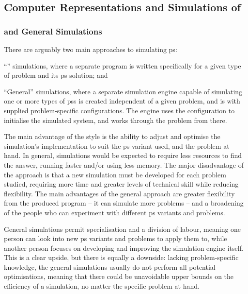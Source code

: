 
\subsection{Computer Representations and Simulations of }

\subsubsection{\Adhoc{} and General Simulations}
There are arguably two main approaches to simulating \gls{ps}:
\begin{inparaenum}[a)]
\item ``\Adhoc{}'' simulations, where a separate program is written specifically for a given type of problem and its \gls{ps} solution; and
\item ``General'' simulations, where a separate simulation engine capable of simulating one or more types of \glspl{ps} is created independent of a given problem, and is with supplied problem-specific configurations.  The engine uses the configuration to initialise the simulated system, and works through the problem from there.
\end{inparaenum}

The main advantage of the \adhoc{} style is the ability to adjust and optimise the simulation's implementation to suit the \gls{ps} variant used, and the problem at hand.  In general, \adhoc{} simulations would be expected to require less resources to find the answer, \eg{} running faster and/or using less memory.  The major disadvantage of the \adhoc{} approach is that a new simulation must be developed for each problem studied, requiring more time and greater levels of technical skill while reducing flexibility.  The main advantages of the general approach are greater flexibility from the produced program -- \ie{} it can simulate more problems -- and a broadening of the people who can experiment with different \gls{ps} variants and problems.%

General simulations permit specialisation and a division of labour, meaning one person can look into new \gls{ps} variants and problems to apply them to, while another person focuses on developing and improving the simulation engine itself.  This is a clear upside, but there is equally a downside: lacking problem-specific knowledge, the general simulations usually do not perform all potential optimisations, meaning that there could be unavoidable upper bounds on the efficiency of a simulation, no matter the specific problem at hand.%


